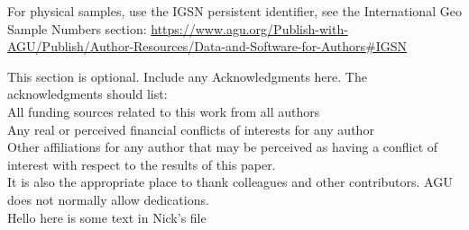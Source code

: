\documentclass[draft]{agujournal2019}
\begin{document}
For physical samples, use the IGSN persistent identifier, see the International Geo Sample Numbers section:
\url{https://www.agu.org/Publish-with-AGU/Publish/Author-Resources/Data-and-Software-for-Authors#IGSN}

\acknowledgments
This section is optional. Include any Acknowledgments here.
The acknowledgments should list:\\
All funding sources related to this work from all authors\\
Any real or perceived financial conflicts of interests for any author\\
Other affiliations for any author \newline that may be perceived as having a conflict of interest with respect to the results of this paper.\\
\clearpage
It is also the appropriate place to thank colleagues and other contributors. AGU does not normally allow dedications.\\
%
Hello here is some text in Nick's file
%



%
%



%



%
%
%
%
%
\end{document}
